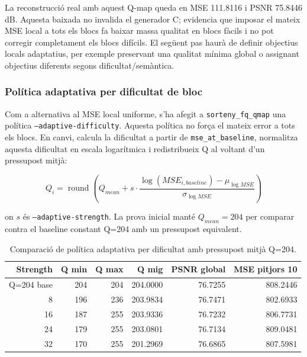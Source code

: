 \documentclass[11pt,a4paper]{article}
\begin{document}
La reconstrucció real amb aquest Q-map queda en MSE 111.8116 i PSNR 75.8446 dB. Aquesta baixada no invalida el generador C; evidencia que imposar el mateix MSE local a tots els blocs fa baixar massa qualitat en blocs fàcils i no pot corregir completament els blocs difícils. El següent pas haurà de definir objectius locals adaptatius, per exemple preservant una qualitat mínima global o assignant objectius diferents segons dificultat/semàntica.

\subsubsection{Política adaptativa per dificultat de bloc}

Com a alternativa al MSE local uniforme, s'ha afegit a \texttt{sorteny\_fq\_qmap} una política \texttt{--adaptive-difficulty}. Aquesta política no força el mateix error a tots els blocs. En canvi, calcula la dificultat a partir de \texttt{mse\_at\_baseline}, normalitza aquesta dificultat en escala logarítmica i redistribueix Q al voltant d'un pressupost mitjà:

\begin{equation}
  Q_i =
  \operatorname{round}
  \left(
    Q_{mean} +
    s \cdot
    \frac{\log(MSE_{i,baseline}) - \mu_{\log MSE}}
    {\sigma_{\log MSE}}
  \right)
\end{equation}

on $s$ és \texttt{--adaptive-strength}. La prova inicial manté $Q_{mean}=204$ per comparar contra el baseline constant Q=204 amb un pressupost equivalent.

\begin{table}[H]
\centering
\begin{tabular}{rrrrrr}
\toprule
\textbf{Strength} & \textbf{Q min} & \textbf{Q max} & \textbf{Q mig} & \textbf{PSNR global} & \textbf{MSE pitjors 10} \\
\midrule
Q=204 base & 204 & 204 & 204.0000 & 76.7255 & 808.2446 \\
8 & 196 & 236 & 203.9834 & 76.7471 & 802.6933 \\
16 & 187 & 255 & 203.9336 & 76.7232 & 806.7731 \\
24 & 179 & 255 & 203.0801 & 76.7134 & 809.0481 \\
32 & 170 & 255 & 201.2969 & 76.6865 & 807.5981 \\
\bottomrule
\end{tabular}
\caption{Comparació de política adaptativa per dificultat amb pressupost mitjà Q=204.}
\end{table}
\end{document}
